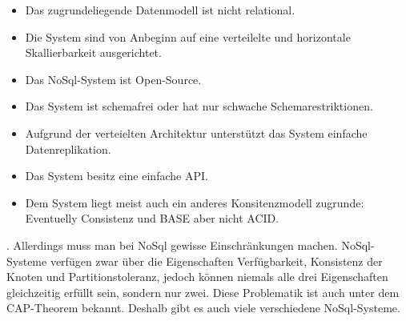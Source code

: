 \begin{itemize}
    \item Das zugrundeliegende Datenmodell ist nicht relational.
    \item Die System sind von Anbeginn auf eine verteilelte und horizontale
        Skallierbarkeit ausgerichtet.
    \item Das NoSql-System ist Open-Source.
    \item Das System ist schemafrei oder hat nur schwache Schemarestriktionen.
    \item Aufgrund der verteielten Architektur unterstützt das System einfache
        Datenreplikation.
    \item Das System besitz eine einfache \gls{API}.
    \item Dem System liegt meist auch ein anderes Konsitenzmodell zugrunde:
        Eventuelly Consistenz und \gls{BASE} aber nicht \gls{ACID}.
\end{itemize}

. Allerdings muss man bei NoSql gewisse Einschränkungen machen. NoSql-Systeme
verfügen zwar über die Eigenschaften Verfügbarkeit, Konsistenz der Knoten und
Partitionstoleranz, jedoch können niemals alle drei Eigenschaften gleichzeitig
erfüllt sein, sondern nur zwei. Diese Problematik ist auch unter
dem \gls{CAP}-Theorem bekannt. Deshalb gibt es auch viele verschiedene
NoSql-Systeme.

